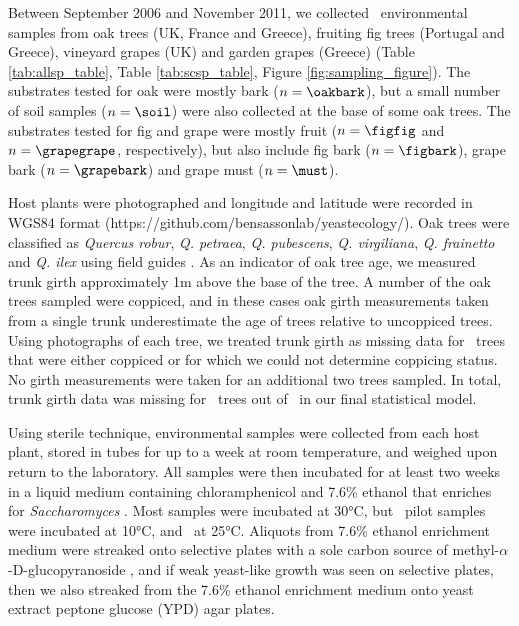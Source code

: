 \documentclass[12pt]{article}
\begin{document}
\begin{linenumbers}
Between September 2006 and November 2011, we collected \samplecount\ environmental samples from oak trees (UK, France and Greece), fruiting fig trees (Portugal and Greece), vineyard grapes (UK) and garden grapes (Greece) (Table \ref{tab:allsp_table}, Table \ref{tab:scsp_table}, Figure \ref{fig:sampling_figure}). The substrates tested for oak were mostly bark ($n=\oakbark$), but a small number of soil samples ($n=\soil$) were also collected at the base of some oak trees. The substrates tested for fig and grape were mostly fruit ($n=\figfig$ and $n=\grapegrape$, respectively), but also include fig bark ($n=\figbark$), grape bark ($n=\grapebark$) and grape must ($n=\must$). 

Host plants were photographed and longitude and latitude were recorded in WGS84 format (https://github.com/bensassonlab/yeastecology/). Oak trees were classified as \textit{Quercus robur}, \textit{Q. petraea}, \textit{Q. pubescens}, \textit{Q. virgiliana}, \textit{Q. frainetto} and \textit{Q. ilex} using field guides \citep{sutton_trees_1990, fitter_trees_2002}. As an indicator of oak tree age, we measured trunk girth approximately 1m above the base of the tree. A number of the oak trees sampled were coppiced, and in these cases oak girth measurements taken from a single trunk underestimate the age of trees relative to uncoppiced trees. Using photographs of each tree, we treated trunk girth as missing data for \coppiced\ trees that were either coppiced or for which we could not determine coppicing status. No girth measurements were taken for an additional two trees sampled. In total, trunk girth data was missing for \missingcircum\ trees out of \treecount\ in our final statistical model. 

Using sterile technique, environmental samples were collected from each host plant, stored in tubes for up to a week at room temperature, and weighed upon return to the laboratory. All samples were then incubated for at least two weeks in a liquid medium containing chloramphenicol and 7.6\% ethanol that enriches for \textit{Saccharomyces} \citep{sniegowski_saccharomyces_2002}. Most samples were incubated at 30\si{\degreeCelsius}, but \sampleten\ pilot samples were incubated at 10\si{\degreeCelsius}, and \sampletwentyfive\ at 25\si{\degreeCelsius}. Aliquots from 7.6\% ethanol enrichment medium were streaked onto selective plates with a sole carbon source of methyl-$\alpha$-D-glucopyranoside \citep{sniegowski_saccharomyces_2002}, and if weak yeast-like growth was seen on selective plates, then we also streaked from the 7.6\% ethanol enrichment medium onto yeast extract peptone glucose (YPD) agar plates. 


\end{linenumbers}
\end{document}
